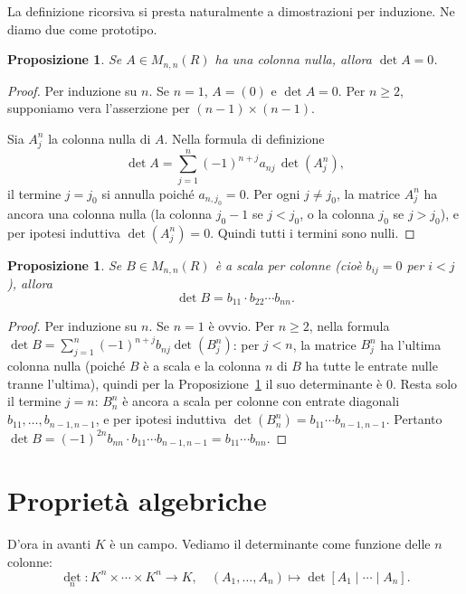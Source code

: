 \documentclass[11pt, a4paper]{book}
\theoremstyle{definition}
\theoremstyle{plain}
\newtheorem{proposizione}[definizione]{Proposizione}
\theoremstyle{remark}
\begin{document}
La definizione ricorsiva si presta naturalmente a dimostrazioni per induzione. Ne diamo due come prototipo.

\begin{proposizione}
\label{prop:col-nulla}
Se $A \in M_{n,n}(R)$ ha una colonna nulla, allora $\det A = 0$.
\end{proposizione}

\begin{proof}
Per induzione su $n$. Se $n=1$, $A=(0)$ e $\det A = 0$. Per $n \geq 2$, supponiamo vera l'asserzione per $(n-1)\times(n-1)$.

Sia $A^n_j$ la colonna nulla di $A$. Nella formula di definizione
\[
  \det A = \sum_{j=1}^n (-1)^{n+j} a_{nj}\,\det(A^n_j),
\]
il termine $j=j_0$ si annulla poiché $a_{n,j_0}=0$. Per ogni $j \neq j_0$, la matrice $A^n_j$ ha ancora una colonna nulla (la colonna $j_0-1$ se $j < j_0$, o la colonna $j_0$ se $j > j_0$), e per ipotesi induttiva $\det(A^n_j)=0$. Quindi tutti i termini sono nulli.
\end{proof}

\begin{proposizione}
\label{prop:scala-colonne}
Se $B \in M_{n,n}(R)$ è a scala per colonne (cioè $b_{ij}=0$ per $i < j$), allora
\[
  \det B = b_{11} \cdot b_{22} \cdots b_{nn}.
\]
\end{proposizione}

\begin{proof}
Per induzione su $n$. Se $n=1$ è ovvio. Per $n \geq 2$, nella formula $\det B = \sum_{j=1}^n(-1)^{n+j}b_{nj}\det(B^n_j)$: per $j < n$, la matrice $B^n_j$ ha l'ultima colonna nulla (poiché $B$ è a scala e la colonna $n$ di $B$ ha tutte le entrate nulle tranne l'ultima), quindi per la Proposizione~\ref{prop:col-nulla} il suo determinante è $0$. Resta solo il termine $j=n$: $B^n_n$ è ancora a scala per colonne con entrate diagonali $b_{11},\ldots,b_{n-1,n-1}$, e per ipotesi induttiva $\det(B^n_n) = b_{11}\cdots b_{n-1,n-1}$. Pertanto $\det B = (-1)^{2n}b_{nn}\cdot b_{11}\cdots b_{n-1,n-1} = b_{11}\cdots b_{nn}$.
\end{proof}

\section{Proprietà algebriche}
\label{sec:det-proprieta}

D'ora in avanti $K$ è un campo. Vediamo il determinante come funzione delle $n$ colonne:
\[
  \det_n \colon K^n \times \cdots \times K^n \longrightarrow K,
  \quad (A_1,\ldots,A_n) \mapsto \det[A_1 \mid \cdots \mid A_n].
\]
\end{document}
